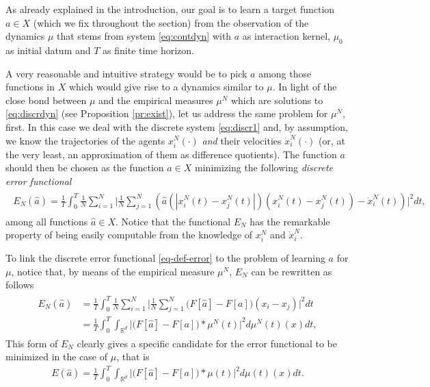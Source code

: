 \documentclass[A4paper,11pt]{article}
\theoremstyle{definition}
\newcommand{\R}{\mathbb{R}}
\begin{document}
As already explained in the introduction, our goal is to learn a target function $a \in X$ (which we fix throughout the section) from the observation of the dynamics $\mu$ that stems from system \eqref{eq:contdyn} with $a$ as interaction kernel, $\mu_0$ as initial datum and $T$ as finite time horizon.

A very reasonable and intuitive strategy would be to pick $a$ among those functions in $X$ which would give rise to a dynamics similar to $\mu$. In light of the close bond between $\mu$ and the empirical measures $\mu^N$ which are solutions to \eqref{eq:discrdyn} (see Proposition \ref{pr:exist}), let us address the same problem for $\mu^N$, first. In this case we deal with the discrete system \eqref{eq:discr1} and, by assumption, we know the trajectories of the agents $x^N_i(\cdot)$ \textit{and} their velocities $\dot{x}^N_i(\cdot)$ (or, at the very least, an approximation of them as difference quotients). The function $a$ should then be chosen as the function $\widehat a \in X$ minimizing the following \textit{discrete error functional}
\begin{align}\label{eq-def-error}
	\begin{split}
	E_N(\widehat a) = \frac{1}{T}\int_0^T\frac{1}{N}\sum_{i=1}^N\biggl|\frac{1}{N}\sum_{j=1}^N
			\left(\widehat a(|x^N_i(t)-x^N_j(t)|)(x^N_i(t) - x^N_j(t))-\dot{x}^N_i(t)\right)\biggr|^2 dt,
	\end{split}
\end{align}
among all functions $\widehat a \in X$. Notice that the functional $E_N$ has the remarkable property of being easily computable from the knowledge of $x^N_i$ and $\dot{x}^N_i$.

To link the discrete error functional \eqref{eq-def-error} to the problem of learning $a$ for $\mu$, notice that, by means of the empirical measure $\mu^N$, $E_N$ can be rewritten as follows
\begin{align*}
	\begin{split}
	E_N(\widehat a) & = \frac{1}{T}\int_0^T\frac{1}{N}\sum_{i=1}^N\biggl|\frac{1}{N}\sum_{j=1}^N
			\bigl(F[\widehat a]-F[a]\bigr)(x_i-x_j)\biggr|^2 dt\\
			& = \frac{1}{T}\int_0^T \int_{\R^d} \biggl|\bigl(F[\widehat a]-F[a]\bigr)\ast\mu^N(t)\biggr|^2d\mu^N(t)(x)dt,
	\end{split}
\end{align*}
This form of $E_N$ clearly gives a specific candidate for the error functional to be minimized in the case of $\mu$, that is
\begin{align*}
	E(\widehat a)=\frac{1}{T}\int_0^T \int_{\R^d} \biggl|\bigl(F[\widehat a]-F[a]\bigr)\ast\mu(t)\biggr|^2d\mu(t)(x)dt.
\end{align*}
\end{document}
